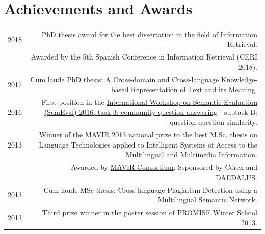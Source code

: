 \documentclass[10pt]{article}
\begin{document}
\section*{Achievements and Awards}
\begin{tabular}{L!{\VRule}R}
  2018 & PhD thesis award for the best dissertation in the field of Information Retrieval.\vspace{5pt}\\
	   &\scriptsize{Awarded by the 5th Spanish Conference in Information Retrieval (CERI 2018).}\vspace{5pt}\\
  2017 & Cum laude PhD thesis: A Cross-domain and Cross-language Knowledge-based Representation of Text and its Meaning.\vspace{5pt}\\
  2016 & First position in the \href{http://alt.qcri.org/semeval2016/task3/}{International Workshop on Se\-man\-tic Evaluation (SemEval) 2016, task 3: community question answering} - subtask B: question-question similarity.\vspace{5pt}\\
  2013 & Winner of the \href{http://www.mavir.net/premio/182-resuelto-premio-mavir-2013}{MAVIR 2013 national prize} to the best M.Sc. thesis on Language Technologies applied to Intelligent Systems of Access
  to the Multilingual and Multimedia Information.\vspace{5pt}\\
  &\scriptsize{Awarded by \href{http://www.mavir.net/}{MAVIR Consortium}. Ssponsored by C{\'o}rex and DAEDALUS.}\vspace{5pt}\\
  2013 & Cum laude MSc thesis: Cross-language Plagiarism Detection using a Multilingual Se\-man\-tic Network.\vspace{5pt}\\

  2013 & Third prize winner in the poster session of PROMISE Winter School 2013.\vspace{5pt}\\
\end{tabular}
\end{document}
